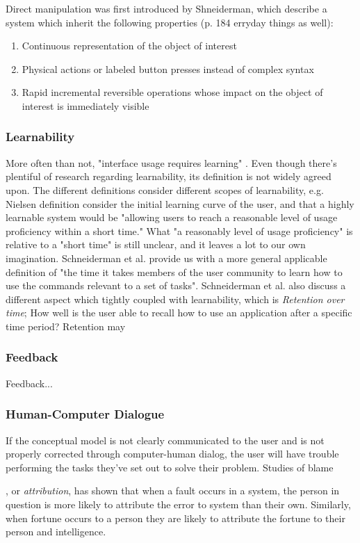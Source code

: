 Direct manipulation was first introduced by Shneiderman, which describe a system which inherit the following properties (p. 184 erryday things as well):

\begin{enumerate}
  \item Continuous representation of the object of interest
  \item Physical actions or labeled button presses instead of complex syntax
  \item Rapid incremental reversible operations whose impact on the object of interest is immediately visible
\end{enumerate}

\subsubsection{Learnability}
More often than not, "interface usage requires learning" \cite{Grossman2009}. Even though there’s plentiful of research regarding learnability, its definition is not widely agreed upon. The different definitions consider different scopes of learnability, e.g. Nielsen definition consider the initial learning curve of the user, and that a highly learnable system would be "allowing users to reach a reasonable level of usage proficiency within a short time." What "a reasonably level of usage proficiency" is relative to a "short time" is still unclear, and it leaves a lot to our own imagination. Schneiderman et al. provide us with a more general applicable definition of "the time it takes members of the user community to learn how to use the commands relevant to a set of tasks". Schneiderman et al. also discuss a different aspect which tightly coupled with learnability, which is \textit{Retention over time}; How well is the user able to recall how to use an application after a specific time period? Retention may

\subsubsection{Feedback}
Feedback...

\subsubsection{Human-Computer Dialogue}

If the conceptual model is not clearly communicated to the user and is not properly corrected through computer-human dialog, the user will have trouble performing the tasks they've set out to solve their problem. Studies of blame , or \textit{attribution}, has shown that when a fault occurs in a system, the person in question is more likely to attribute the error to system than their own. Similarly, when fortune occurs to a person they are likely to attribute the fortune to their person and intelligence.

